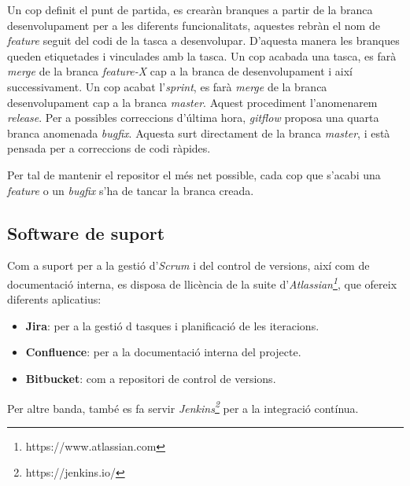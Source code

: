 Un cop definit el punt de partida, es crearàn branques a partir de la branca desenvolupament per a les diferents funcionalitats, aquestes rebràn el nom de \textit{feature} seguit del codi de la tasca a desenvolupar. D'aquesta manera les branques queden etiquetades i vinculades amb la tasca.
\newline Un cop acabada una tasca, es farà \textit{merge} de la branca \textit{feature-X} cap a la branca de desenvolupament i així successivament.
\newline Un cop acabat l'\textit{sprint}, es farà \textit{merge} de la branca desenvolupament cap a la branca \textit{master}. Aquest procediment l'anomenarem \textit{release}.
\newline Per a possibles correccions d'última hora, \textit{gitflow} proposa una quarta branca anomenada \textit{bugfix}. Aquesta surt directament de la branca \textit{master}, i està pensada per a correccions de codi ràpides.

Per tal de mantenir el repositor el més net possible, cada cop que s'acabi una \textit{feature} o un \textit{bugfix} s'ha de tancar la branca creada.

\subsection{Software de suport}
Com a suport per a la gestió d'\textit{Scrum} i del control de versions, així com de documentació interna, es disposa de llicència de la suite d'\textit{Atlassian\footnote{https://www.atlassian.com}}, que ofereix diferents aplicatius:
\begin{itemize}
	\item \textbf{Jira}: per a la gestió d tasques i planificació de les iteracions.
	\item \textbf{Confluence}: per a la documentació interna del projecte.
	\item \textbf{Bitbucket}: com a repositori de control de versions.
\end{itemize}
Per altre banda, també es fa servir \textit{Jenkins\footnote{https://jenkins.io/}} per a la integració contínua.





